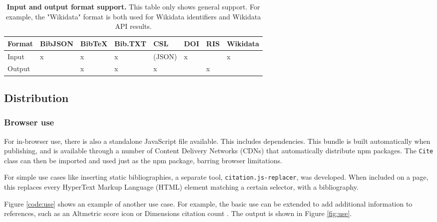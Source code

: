 \documentclass[fleqn,10pt,lineno]{wlpeerj} %
\begin{document}
\begin{table}[bt!]
\caption{\textbf{Input and output format support.}
This table only shows general support. For example, the "Wikidata" format is both used for Wikidata identifiers and Wikidata API results.}
\label{table:support}
\begin{tabular}{|l|l|l|l|l|l|l|l|}
\hline
\textbf{Format} & \textbf{BibJSON} & \textbf{BibTeX} & \textbf{Bib.TXT} & \textbf{CSL} & \textbf{DOI} & \textbf{RIS} & \textbf{Wikidata} \\ \hline
Input           & x                & x               & x                & (JSON)       & x            &              & x                 \\ \hline
Output          & \textbf{}        & x               & x                & x            &              & x            &                   \\ \hline
\end{tabular}
\end{table}

\subsection*{Distribution}

\subsubsection*{Browser use}

For in-browser use, there is also a standalone JavaScript file available. This includes dependencies. This bundle is built automatically when publishing, and is available through a number of Content Delivery Networks (CDNs) that automatically distribute npm packages. The \texttt{Cite} class can then be imported and used just as the npm package, barring browser limitations.

For simple use cases like inserting static bibliographies, a separate tool, \texttt{citation.js-replacer}, was developed. When included on a page, this replaces every HyperText Markup Language (HTML) element matching a certain selector, with a bibliography.

Figure \ref{code:use} shows an example of another use case. For example, the basic use can be extended to add additional information to references, such as an Altmetric \citep{adie_altmetric:_2013} score icon or Dimensions citation count \citep{thelwall_dimensions:_2018}. The output is shown in Figure \ref{fig:use}.
\end{document}
